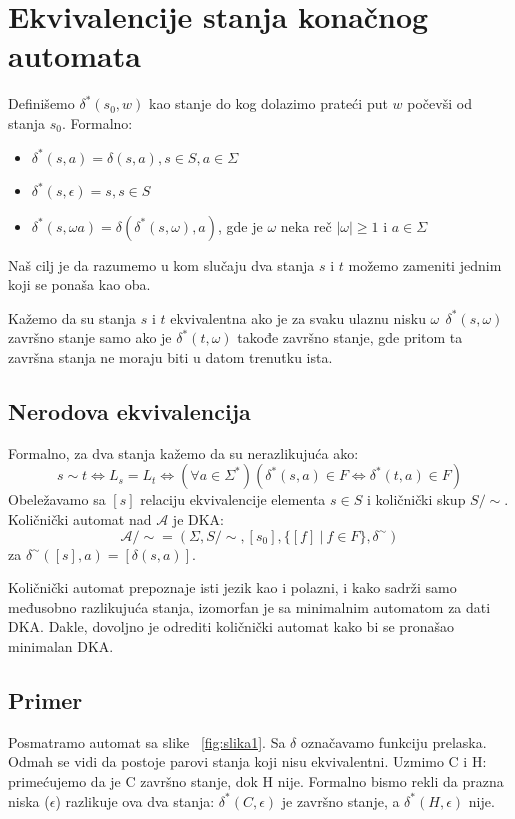 \documentclass[a4paper]{article}
\begin{document}
\newpage

\section{Ekvivalencije stanja konačnog automata}
Definišemo $\delta^{*}(s_{0}, w)$ kao stanje do kog dolazimo prateći put $w$ počevši od stanja $s_{0}$.
Formalno:
\begin{itemize}
\item $\delta^{*}(s, a) = \delta(s, a), s \in S, a \in \Sigma$
\item $\delta^{*}(s, \epsilon) = s, s \in S$
\item $\delta^{*}(s, \omega a) = \delta(\delta^{*}(s, \omega), a)$, gde je $\omega$ neka reč $|\omega| \geq 1$ i $a \in \Sigma$
\end{itemize}
\vspace{5pt}
Naš cilj je da razumemo u kom slučaju dva stanja $s$ i $t$ možemo zameniti jednim koji se ponaša kao oba. \par 
Kažemo da su stanja $s$ i $t$ ekvivalentna ako je za svaku ulaznu nisku $\omega \ \ \delta^{*}(s, \omega)$ završno stanje samo ako je $\delta^{*}(t, \omega)$ takođe završno stanje, gde pritom ta završna stanja ne moraju biti u datom trenutku ista.

\subsection{Nerodova ekvivalencija}
Formalno, za dva stanja kažemo da su nerazlikujuća ako:
$$ s \sim t \iff L_{s} = L_{t} \iff (\forall a \in \Sigma^{*})(\delta^{*}(s, a) \in F \iff \delta^{*}(t, a) \in F)$$
Obeležavamo sa $[s]$ relaciju ekvivalencije elementa $s \in S$ i količnički skup $S/\sim$. Količnički automat nad $\mathcal{A}$ je DKA:
$$\mathcal{A}/\sim=(\Sigma, S / \sim, [s_{0}], \{[f] \ | \ f \in F \}, \delta^{\sim})$$
za $\delta^{\sim}([s], a) = [\delta(s, a)]$. \par
Količnički automat prepoznaje isti jezik kao i polazni, i kako sadrži samo međusobno razlikujuća stanja, izomorfan je sa minimalnim automatom za dati DKA. Dakle, dovoljno je odrediti količnički automat kako bi se pronašao minimalan DKA.

\subsection{Primer}
Posmatramo automat sa slike ~\ref{fig:slika1}. Sa $\delta$ označavamo funkciju prelaska. Odmah se vidi da postoje parovi stanja koji nisu ekvivalentni. Uzmimo C i H: primećujemo da je C završno stanje, dok H nije. Formalno bismo rekli da prazna niska ($\epsilon$) razlikuje ova dva stanja: $\delta^{*}(C, \epsilon)$ je završno stanje, a $\delta^{*}(H, \epsilon)$ nije.
\end{document}
